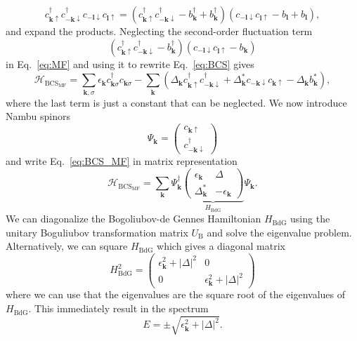 \begin{equation}
c_{\bm{k}\uparrow}^{\dagger}c_{-\bm{k}\downarrow}^{\dagger}c_{-\bm{l}\downarrow}c_{\bm{l}\uparrow}=\left(c_{\bm{k}\uparrow}^{\dagger}c_{-\bm{k}\downarrow}^{\dagger}-b_{\bm{k}}^{\dagger}+b_{\bm{k}}^{\dagger}\right)\left(c_{-\bm{l}\downarrow}c_{\bm{l}\uparrow}-b_{\bm{l}}+b_{\bm{l}}\right),\label{eq:MF}
\end{equation}
and expand the products.
Neglecting the second-order fluctuation term
\begin{equation}
\left(c_{\bm{k}\uparrow}^{\dagger}c_{-\bm{k}\downarrow}^{\dagger}-b_{\bm{k}}^{\dagger}\right)\left(c_{-\bm{l}\downarrow}c_{\bm{l}\uparrow}-b_{\bm{k}}\right)
\end{equation}
in Eq.~\ref{eq:MF} and using it to rewrite Eq.~\ref{eq:BCS} gives
\begin{equation}
\mathcal{H}_{\textrm{BCS}_{\textrm{MF}}}=\underset{\bm{k},\sigma}{\sum}\epsilon_{\bm{k}}c_{\bm{k}\sigma}^{\dagger}c_{\bm{k}\sigma}-\underset{\bm{k}}{\sum}\left(\Delta_{\bm{k}}c_{\bm{k}\uparrow}^{\dagger}c_{-\bm{k}\downarrow}^{\dagger}+\Delta_{\bm{k}}^{*}c_{-\bm{k}\downarrow}c_{\bm{k}\uparrow}-\Delta_{\bm{k}}b_{\bm{k}}^{*}\right),\label{eq:BCS_MF}
\end{equation}
where the last term is just a constant that can be neglected.
We now introduce Nambu spinors
\begin{equation}
\Psi_{\bm{k}}=\left(\begin{array}{c}
c_{\bm{k}\uparrow}\\
c_{-\bm{k}\downarrow}^{\dagger}
\end{array}\right)\label{eq:Nambu}
\end{equation}
and write Eq.~\ref{eq:BCS_MF} in matrix representation
\[
\mathcal{H}_{\textrm{BCS}_{\textrm{MF}}}=\underset{\bm{k}}{\sum}\Psi_{\bm{k}}^{\dagger}\underset{H_{\textrm{BdG}}}{\underbrace{\left(\begin{array}{cc}
\epsilon_{\bm{k}} & \Delta\\
\Delta_{\bm{k}}^{*} & -\epsilon_{\bm{k}}
\end{array}\right)}}\Psi_{\bm{k}}.
\]
We can diagonalize the Bogoliubov-de Gennes Hamiltonian $H_{\textrm{BdG}}$ using the unitary Boguliubov transformation matrix $U_{\textrm{B}}$ and solve the eigenvalue problem.
Alternatively, we can square $H_{\textrm{BdG}}$ which gives a diagonal matrix
\[
H_{\textrm{BdG}}^{2}=\left(\begin{array}{cc}
\epsilon_{\bm{k}}^{2}+\left|\Delta\right|^{2} & 0\\
0 & \epsilon_{\bm{k}}^{2}+\left|\Delta\right|^{2}
\end{array}\right)
\]
where we can use that the eigenvalues are the square root of the eigenvalues of $H_{\textrm{BdG}}$.
This immediately result in the spectrum
\begin{equation}
E=\pm\sqrt{\epsilon_{\bm{k}}^{2}+\left|\Delta\right|^{2}}.\label{eq:SC_spectrum}
\end{equation}

